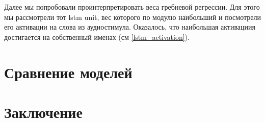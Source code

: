 \documentclass[pdftex,ptm,12pt,a4paper]{report}
\theoremstyle{definition}
\begin{document}
Далее мы попробовали проинтерпретировать веса гребневой регрессии. Для этого мы рассмотрели тот lstm unit, вес которого по модулю наибольший и посмотрели его активации на слова из аудиостимула. Оказалось, что наибольшая активациия достигается на собственный именах (см \ref{lstm_activation}).

\chapter{Сравнение моделей}

\chapter{Заключение}



\end{document}
